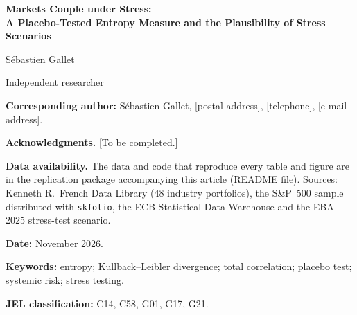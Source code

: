 \documentclass[12pt]{article}
\theoremstyle{definition}
\theoremstyle{remark}
\begin{document}
\begin{titlepage}
\begin{center}
{\Large\bfseries Markets Couple under Stress:\\[4pt]
A Placebo-Tested Entropy Measure and the Plausibility of Stress Scenarios\par}
\vspace{1.5cm}
{\large Sébastien Gallet\par}
\vspace{0.3cm}
Independent researcher\par
\vspace{1.2cm}
\end{center}
\noindent\textbf{Corresponding author:} Sébastien Gallet, [postal address],
[telephone], [e-mail address].\par
\vspace{0.6cm}
\noindent\textbf{Acknowledgments.} [To be completed.]\par
\vspace{0.6cm}
\noindent\textbf{Data availability.} The data and code that reproduce every
table and figure are in the replication package accompanying this article
(README file). Sources: Kenneth R.\ French Data Library (48 industry
portfolios), the S\&P~500 sample distributed with \texttt{skfolio}, the ECB
Statistical Data Warehouse and the EBA 2025 stress-test scenario.\par
\vspace{0.6cm}
\noindent\textbf{Date:} November 2026.
\end{titlepage}
\setcounter{page}{2}

\begin{doublespace}
\begin{abstract}
\noindent We build an entropy measure of market coupling and test it against
two placebo nulls, one without dynamics and one that preserves GARCH
volatility. On US stocks, US industries and euro-area markets, coupling passes
both nulls and a within-year comparison: under stress, correlations couple
and the effective number of independent risk sources falls. The same tests
show that other crisis signatures of rolling entropy indicators, such as jumps
and fattening tails, are estimation artefacts. We derive the estimator's
finite-sample bias and the test's size and power, and price stress scenarios
in nats, including the EBA 2025 adverse scenario.
\end{abstract}

\vspace{0.5cm}
\noindent\textbf{Keywords:} entropy; Kullback--Leibler divergence; total
correlation; placebo test; systemic risk; stress testing.

\noindent\textbf{JEL classification:} C14, C58, G01, G17, G21.
\end{doublespace}
\newpage
\end{document}
